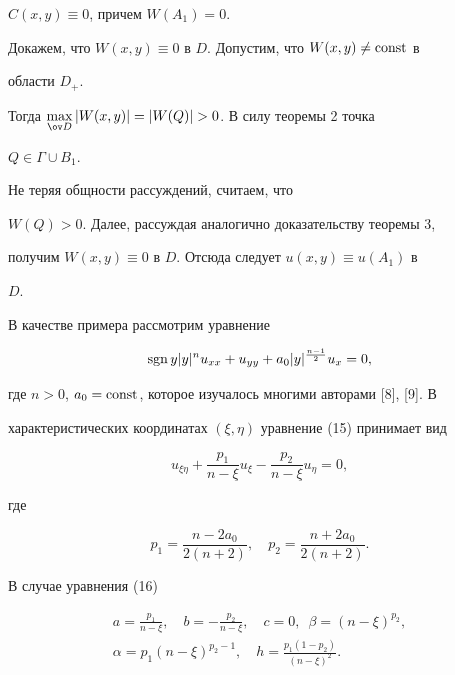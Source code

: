 $C(x,y)\equiv0$, причем $W(A_1)=0$. 


Докажем, что $W(x,y)\equiv0$ в $D$. Допустим, что $W(x,y)\ne\operatorname{const}$ в 


области $D_+$. 


Тогда $\max\limits_{\ov D}|W(x,y)|=|W(Q)|>0$. В силу теоремы 2 точка 


$Q\in\Gamma\cup B_1$. 


Не теряя общности рассуждений, считаем, что 


$W(Q)>0$. Далее, рассуждая аналогично доказательству теоремы 3, 


получим $W(x,y)\equiv0$ в $D$. Отсюда следует $u(x,y)\equiv u(A_1)$ в 


$D$. 


 


В качестве примера рассмотрим уравнение 


\begin{equation} 


\sgn y|y|^n u_{xx}+u_{yy}+a_0|y|^{\frac{n-1}{2}}u_x=0, 


\end{equation} 


где $n>0$, $a_0=\operatorname{const}$, которое изучалось многими авторами [8], [9]. В 


характеристических координатах $(\xi,\eta)$ уравнение (15) принимает вид 


\begin{equation} 


u_{\xi\eta}+\frac{p_1}{n-\xi}u_\xi-\frac{p_2}{n-\xi}u_\eta=0, 


\end{equation} 


где 


$$ 


p_1=\frac{n-2a_0}{2(n+2)},\quad p_2=\frac{n+2a_0}{2(n+2)}. 


$$ 


В случае уравнения (16) 


\begin{gather*} 


a=\frac{p_1}{n-\xi},\quad b=-\frac{p_2}{n-\xi},\quad 


c=0,\ \; \beta=(n-\xi)^{p_2},\\ 


\alpha=p_1(n-\xi)^{p_2-1},\quad h=\frac{p_1(1-p_2)}{(n-\xi)^2}. 


\end{gather*} 


